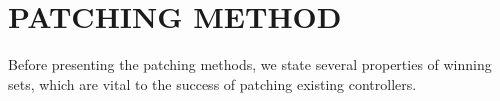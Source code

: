 
\section{PATCHING METHOD}
\label{sec:method}

 Before presenting the patching methods, we state several properties of winning sets, which are vital to the success of patching existing controllers.


